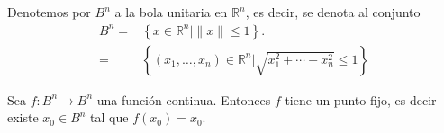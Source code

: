 \documentclass[12pt]{report}
\theoremstyle{largebreak}
\newcommand\cf[3]{\ensuremath{#1:#2\rightarrow#3}}
\begin{document}
Denotemos por $B^n$ a la bola unitaria en $\mathbb{R}^n$, es decir, se denota al conjunto
\begin{equation*}
    \begin{split}
        B^n=&\left\{x\in\mathbb{R}^n|\|x\|\leq 1\right\}.\\
        =&\left\{(x_1,\dots,x_n)\in\mathbb{R}^n|\sqrt{x_1^2+\cdots+x_n^2}\leq1\right\}
    \end{split}
\end{equation*}

\setcounter{section}{6}
\setcounter{theor}{12}

\begin{theor}
    Sea $\cf{f}{B^n}{B^n}$ una función continua. Entonces $f$ tiene un punto fijo, es decir existe $x_0\in B^n$ tal que $f(x_0)=x_0$.
\end{theor}
\end{document}
